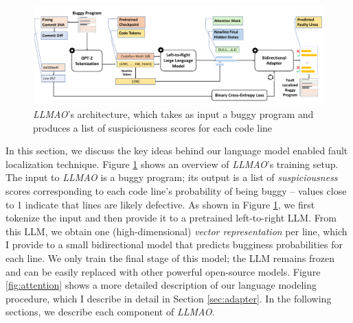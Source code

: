 \documentclass[12pt,openany,oneside,table]{cmuthesis}
\begin{document}
\begin{figure}
\centering
\includegraphics[width=\textwidth]{figures/approach/overview.pdf}
\caption{\small \textit{LLMAO}’s architecture, which takes as input a buggy program and produces a list of suspiciousness scores for each code line}
\label{fig:overview-llmao}
\end{figure}

In this section, we discuss the key ideas behind our language model enabled fault localization technique.
Figure \ref{fig:overview-llmao} shows an overview of \textit{LLMAO}'s training setup. The input to \textit{LLMAO} is a buggy program; its output is a list of \emph{suspiciousness} scores corresponding to each code line's probability of being buggy -- values close to 1 indicate that lines are likely defective. As shown in Figure \ref{fig:overview-llmao}, we first tokenize the input and then provide it to a pretrained left-to-right LLM. From this LLM, we obtain one (high-dimensional) \emph{vector representation} per line, which I provide to a small bidirectional model that predicts bugginess probabilities for each line. We only train the final stage of this model; the LLM remains frozen and can be easily replaced with other powerful open-source models. Figure \ref{fig:attention} shows a more detailed description of our language modeling procedure, which I describe in detail in Section \ref{sec:adapter}.
In the following sections, we describe each component of \textit{LLMAO}.
    
\end{document}
